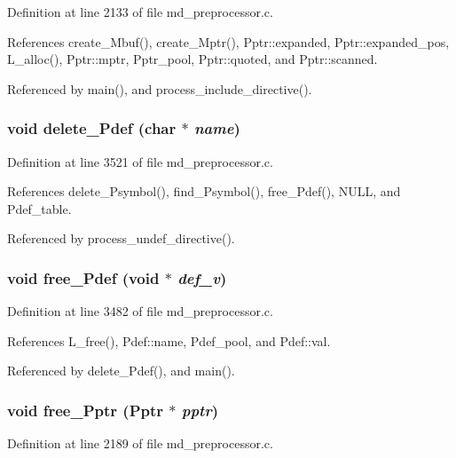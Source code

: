 Definition at line 2133 of file md\_\-preprocessor.c.

References create\_\-Mbuf(), create\_\-Mptr(), Pptr::expanded, Pptr::expanded\_\-pos, L\_\-alloc(), Pptr::mptr, Pptr\_\-pool, Pptr::quoted, and Pptr::scanned.

Referenced by main(), and process\_\-include\_\-directive().
\subsubsection{\setlength{\rightskip}{0pt plus 5cm}void delete\_\-Pdef (char $\ast$ {\em name})}\label{md__preprocessor_8h_3cde2100eec552f5ae6db0940aef4d34}




Definition at line 3521 of file md\_\-preprocessor.c.

References delete\_\-Psymbol(), find\_\-Psymbol(), free\_\-Pdef(), NULL, and Pdef\_\-table.

Referenced by process\_\-undef\_\-directive().
\subsubsection{\setlength{\rightskip}{0pt plus 5cm}void free\_\-Pdef (void $\ast$ {\em def\_\-v})}\label{md__preprocessor_8h_89ffda2e246f0a64495be522f05cbadd}




Definition at line 3482 of file md\_\-preprocessor.c.

References L\_\-free(), Pdef::name, Pdef\_\-pool, and Pdef::val.

Referenced by delete\_\-Pdef(), and main().
\subsubsection{\setlength{\rightskip}{0pt plus 5cm}void free\_\-Pptr (\bf{Pptr} $\ast$ {\em pptr})}\label{md__preprocessor_8h_4640aa292e2cee439780e0e2c231b8ed}




Definition at line 2189 of file md\_\-preprocessor.c.

